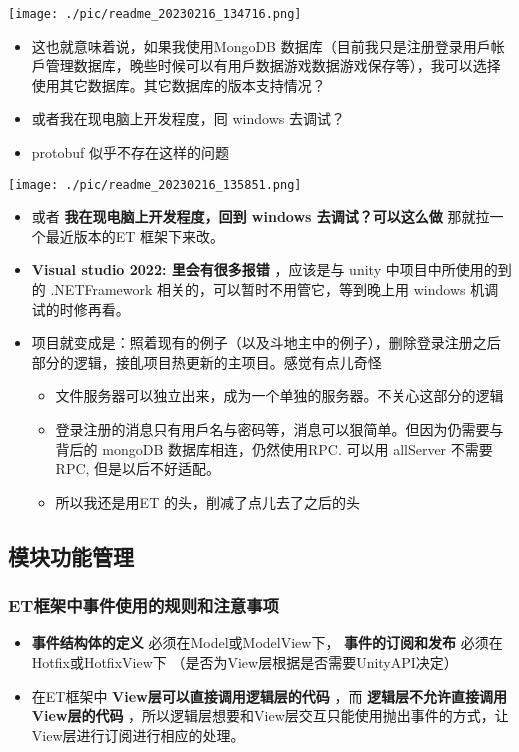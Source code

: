 \documentclass[9pt, b5paper]{article}
\begin{document}
\texttt{[image: ./pic/readme\_20230216\_134716.png]}
\begin{itemize}
\item 这也就意味着说，如果我使用MongoDB 数据库（目前我只是注册登录用戶帐戶管理数据库，晚些时候可以有用戶数据游戏数据游戏保存等），我可以选择使用其它数据库。其它数据库的版本支持情况？
\item 或者我在现电脑上开发程度，囘 windows 去调试？
\item protobuf 似乎不存在这样的问题
\end{itemize}

\texttt{[image: ./pic/readme\_20230216\_135851.png]}
\begin{itemize}
\item 或者 \textbf{我在现电脑上开发程度，回到 windows 去调试？可以这么做} 那就拉一个最近版本的ET 框架下来改。
\item \textbf{Visual studio 2022: 里会有很多报错} ，应该是与 unity 中项目中所使用的到的 .NETFramework 相关的，可以暂时不用管它，等到晚上用 windows 机调试的时修再看。
\item 项目就变成是：照着现有的例子（以及斗地主中的例子），删除登录注册之后部分的逻辑，接臫项目热更新的主项目。感觉有点儿奇怪
\begin{itemize}
\item 文件服务器可以独立出来，成为一个单独的服务器。不关心这部分的逻辑
\item 登录注册的消息只有用戶名与密码等，消息可以狠简单。但因为仍需要与背后的 mongoDB 数据库相连，仍然使用RPC. 可以用 allServer 不需要 RPC, 但是以后不好适配。
\item 所以我还是用ET 的头，削减了点儿去了之后的头
\end{itemize}
\end{itemize}
\subsection{模块功能管理}
\label{sec-1-2}
\subsubsection{ET框架中事件使用的规则和注意事项}
\label{sec-1-2-1}
\begin{itemize}
\item \textbf{事件结构体的定义} 必须在Model或ModelView下， \textbf{事件的订阅和发布} 必须在Hotfix或HotfixView下 （是否为View层根据是否需要UnityAPI决定）
\item 在ET框架中 \textbf{View层可以直接调用逻辑层的代码} ，而 \textbf{逻辑层不允许直接调用View层的代码} ，所以逻辑层想要和View层交互只能使用抛出事件的方式，让View层进行订阅进行相应的处理。
\end{itemize}
\end{document}
